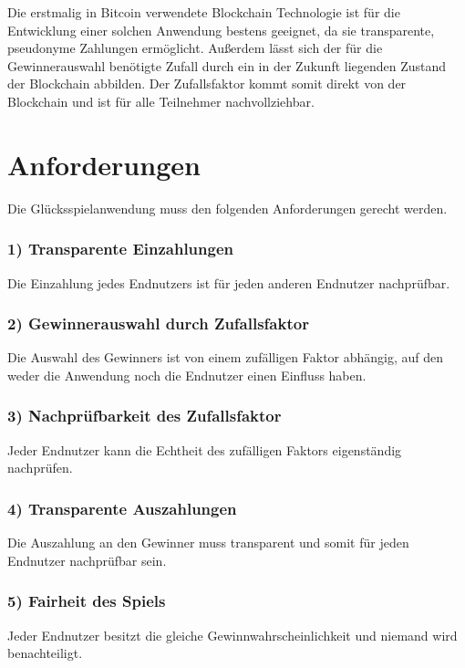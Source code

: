 Die erstmalig in Bitcoin verwendete Blockchain Technologie ist für die Entwicklung einer solchen Anwendung bestens geeignet, da sie transparente, pseudonyme Zahlungen ermöglicht. Außerdem lässt sich der für die Gewinnerauswahl benötigte Zufall durch ein in der Zukunft liegenden Zustand der Blockchain abbilden. 
Der Zufallsfaktor kommt somit direkt von der Blockchain und ist für alle Teilnehmer nachvollziehbar.



\section{Anforderungen}\label{anforderungen}
Die Glücksspielanwendung muss den folgenden Anforderungen gerecht werden.
\subsubsection{1) Transparente Einzahlungen}
Die Einzahlung jedes Endnutzers ist für jeden anderen Endnutzer nachprüfbar.
\subsubsection{2) Gewinnerauswahl durch Zufallsfaktor}
Die Auswahl des Gewinners ist von einem zufälligen Faktor abhängig, auf den weder die Anwendung noch die Endnutzer einen Einfluss haben.
\subsubsection{3) Nachprüfbarkeit des Zufallsfaktor}
Jeder Endnutzer kann die Echtheit des zufälligen Faktors eigenständig nachprüfen.
\subsubsection{4) Transparente Auszahlungen}
Die Auszahlung an den Gewinner muss transparent und somit für jeden Endnutzer nachprüfbar sein.
\subsubsection{5) Fairheit des Spiels}
Jeder Endnutzer besitzt die gleiche Gewinnwahrscheinlichkeit und niemand wird benachteiligt.

